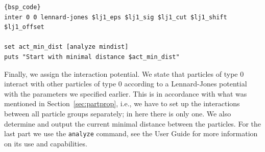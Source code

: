 \documentclass[
paper=a4,                       %
fontsize=11pt,                  %
twoside,                        %
footsepline,                    %
headsepline,                    %
headinclude=false,              %
footinclude=false,              %
pagesize,                       %
]{scrartcl}
\newtheorem{task}{Task}
\begin{document}
{\small\vspace{0,2cm}
\begin{lstlisting}[firstnumber=auto]{bsp_code}
inter 0 0 lennard-jones $lj1_eps $lj1_sig $lj1_cut $lj1_shift $lj1_offset

set act_min_dist [analyze mindist]
puts "Start with minimal distance $act_min_dist"
\end{lstlisting}\vspace{0,2cm}
}

\noindent Finally, we assign the interaction potential. We state that particles of type 0 interact with other particles of type 0 according to a Lennard-Jones potential with the parameters we specified earlier. This is in accordance with what was mentioned in Section~\ref{sec:partprop}, i.e., we have to set up the interactions between all particle groups separately; in here there is only one. We also determine and output the current minimal distance between the particles. For the last part we use the \es{} \lstinline|analyze| command, see the User Guide for more information on its use and capabilities. 

\vspace{1cm}
\vspace{1cm}
\end{document}
